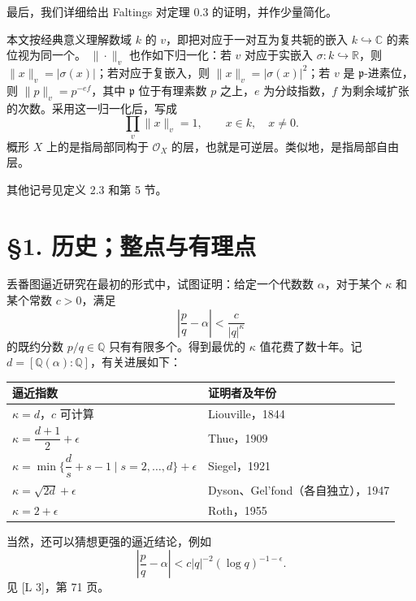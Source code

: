最后，我们详细给出 Faltings 对定理 0.3 的证明，并作少量简化。

本文按经典意义理解数域 $k$ 的 $v$，即把对应于一对互为复共轭的嵌入 $k\hookrightarrow\mathbb C$ 的素位视为同一个。 $\|\cdot\|_v$ 也作如下归一化：若 $v$ 对应于实嵌入 $\sigma:k\hookrightarrow\mathbb R$，则 $\|x\|_v=|\sigma(x)|$；若对应于复嵌入，则 $\|x\|_v=|\sigma(x)|^2$；若 $v$ 是 $\mathfrak p$-进素位，则 $\|p\|_v=p^{-ef}$，其中 $\mathfrak p$ 位于有理素数 $p$ 之上，$e$ 为分歧指数，$f$ 为剩余域扩张的次数。采用这一归一化后，写成
\begin{equation*}
\prod_v\|x\|_v=1,\qquad x\in k,\quad x\ne0.\tag{0.4}
\end{equation*}
概形 $X$ 上的是指局部同构于 $\mathcal O_X$ 的层，也就是可逆层。类似地，是指局部自由层。

其他记号见定义 2.3 和第 5 节。

\section*{§1. 历史；整点与有理点}
丢番图逼近研究在最初的形式中，试图证明：给定一个代数数 $\alpha$，对于某个 $\kappa$ 和某个常数 $c>0$，满足
\[
\left|\frac pq-\alpha\right|<\frac c{|q|^\kappa}
\]
的既约分数 $p/q\in\mathbb Q$ 只有有限多个。得到最优的 $\kappa$ 值花费了数十年。记 $d=[\mathbb Q(\alpha):\mathbb Q]$，有关进展如下：
\begin{center}
\begin{tabular}{@{}ll@{}}
\toprule
逼近指数 & 证明者及年份\\
\midrule
$\kappa=d$，$c$ 可计算 & Liouville，1844\\
$\kappa=\dfrac{d+1}{2}+\epsilon$ & Thue，1909\\
$\kappa=\min\{\dfrac ds+s-1\mid s=2,\ldots,d\}+\epsilon$ & Siegel，1921\\
$\kappa=\sqrt{2d}+\epsilon$ & Dyson、Gel'fond（各自独立），1947\\
$\kappa=2+\epsilon$ & Roth，1955\\
\bottomrule
\end{tabular}
\end{center}
当然，还可以猜想更强的逼近结论，例如
\[
\left|\frac pq-\alpha\right|<c|q|^{-2}(\log q)^{-1-\epsilon}.
\]
见 [L 3]，第 71 页。

